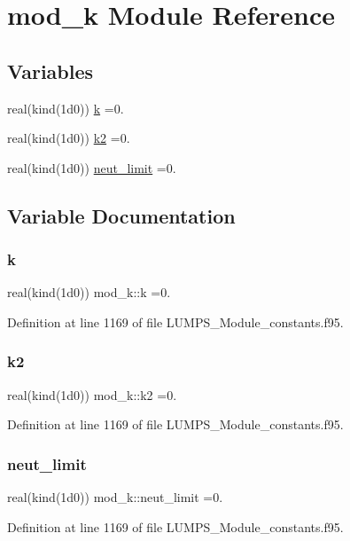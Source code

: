 \hypertarget{namespacemod__k}{}\section{mod\+\_\+k Module Reference}
\label{namespacemod__k}
\subsection*{Variables}
\begin{DoxyCompactItemize}
\item 
real(kind(1d0)) \hyperlink{namespacemod__k_a75bb9b4e883eadeb3233662441943aaf}{k} =0.
\item 
real(kind(1d0)) \hyperlink{namespacemod__k_a85838ba0577d2383b8c545d028333e48}{k2} =0.
\item 
real(kind(1d0)) \hyperlink{namespacemod__k_a22d2aee55ef526b3cae06021044b7ae0}{neut\+\_\+limit} =0.
\end{DoxyCompactItemize}


\subsection{Variable Documentation}
\mbox{\label{namespacemod__k_a75bb9b4e883eadeb3233662441943aaf}} 
\subsubsection{\texorpdfstring{k}{k}}
{\footnotesize\ttfamily real(kind(1d0)) mod\+\_\+k\+::k =0.}



Definition at line 1169 of file L\+U\+M\+P\+S\+\_\+\+Module\+\_\+constants.\+f95.

\mbox{\label{namespacemod__k_a85838ba0577d2383b8c545d028333e48}} 
\subsubsection{\texorpdfstring{k2}{k2}}
{\footnotesize\ttfamily real(kind(1d0)) mod\+\_\+k\+::k2 =0.}



Definition at line 1169 of file L\+U\+M\+P\+S\+\_\+\+Module\+\_\+constants.\+f95.

\mbox{\label{namespacemod__k_a22d2aee55ef526b3cae06021044b7ae0}} 
\subsubsection{\texorpdfstring{neut\+\_\+limit}{neut\_limit}}
{\footnotesize\ttfamily real(kind(1d0)) mod\+\_\+k\+::neut\+\_\+limit =0.}



Definition at line 1169 of file L\+U\+M\+P\+S\+\_\+\+Module\+\_\+constants.\+f95.


